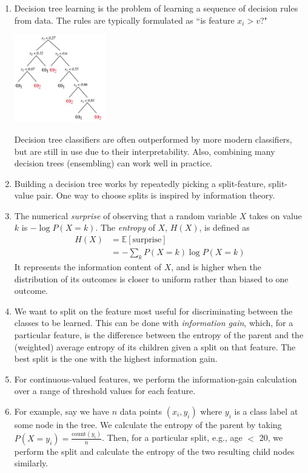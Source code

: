 \documentclass[10pt]{article}
\begin{document}
\begin{multicols}{2}
\begin{addmargin}[0.8em]{0.5em}
\begin{enumerate}[label=(\alph*)]
        \item Decision tree learning is the problem of learning a sequence of decision rules from data. The rules are typically formulated as ``is feature $x_i > v$?"
        \begin{center}
            \includegraphics[width=4cm]{dt.png}
        \end{center}
        Decision tree classifiers are often outperformed by more modern classifiers, but are still in use due to their interpretability. Also, combining many decision trees (ensembling) can work well in practice.
        \item Building a decision tree works by repeatedly picking a split-feature, split-value pair. One way to choose splits is inspired by information theory.
        \item The numerical \textit{surprise} of observing that a random variable $X$ takes on value $k$ is $-\log{P(X=k)}$. The \textit{entropy} of $X$, $H(X)$, is defined as
        \begin{align*}
            H(X) &= \mathbb{E}[\text{surprise}] \\
            &= - \sum_k P(X=k) \log{P(X=k)}
        \end{align*}
        It represents the information content of $X$, and is higher when the distribution of its outcomes is closer to uniform rather than biased to one outcome.
        
        \item We want to split on the feature most useful for discriminating between the classes to be learned. This can be done with \textit{information gain}, which, for a particular feature, is the difference between the entropy of the parent and the (weighted) average entropy of its children given a split on that feature. The best split is the one with the highest information gain.
       
        \item For continuous-valued features, we perform the information-gain calculation over a range of threshold values for each feature.
        
        \item For example, say we have $n$ data points $(x_i, y_i)$ where $y_i$ is a class label at some node in the tree. We calculate the entropy of the parent by taking $P(X = y_i) = \frac{\text{count}(y_i)}{n}$. Then, for a particular split, e.g., age $<$ 20, we perform the split and calculate the entropy of the two resulting child nodes similarly.
        

\end{enumerate}
\end{addmargin}
\end{multicols}
\end{document}
